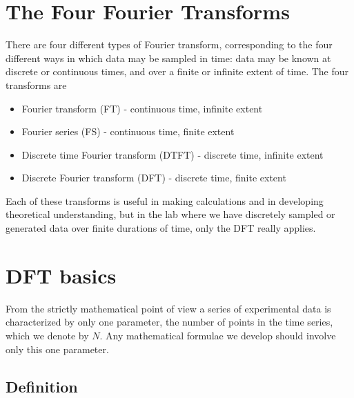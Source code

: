 \section{The Four Fourier Transforms}

There are four different types of Fourier transform, corresponding
to the four different ways in which data may be sampled in time: data
may be known at discrete or continuous times, and over a finite or
infinite extent of time. The four transforms are 
\begin{itemize}
\item Fourier transform (FT) - continuous time, infinite extent 
\item Fourier series (FS) - continuous time, finite extent 
\item Discrete time Fourier transform (DTFT) - discrete time, infinite extent 
\item Discrete Fourier transform (DFT) - discrete time, finite extent 
\end{itemize}
Each of these transforms is useful in making calculations and in developing theoretical understanding, but in the lab where we have discretely sampled or generated data over finite durations of time, only the DFT really applies.


\section{DFT basics}

From the strictly mathematical point of view a series of experimental data is characterized by only one parameter, the number of points in the time series, which we denote by $N$.
Any mathematical formulae we develop should involve only this one parameter.

\subsection{Definition}

